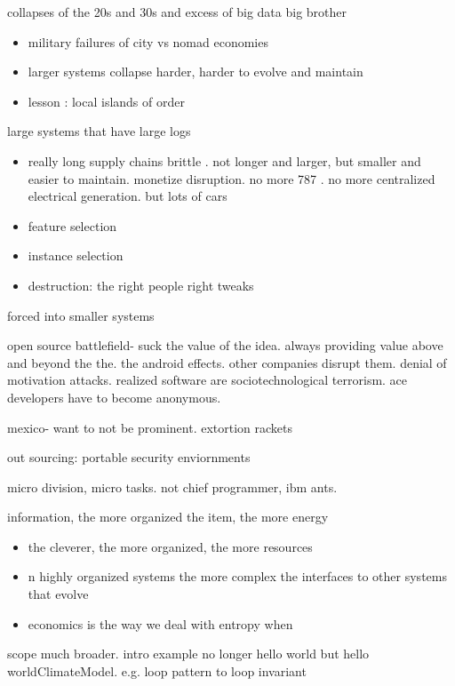 \documentclass[journal]{IEEEtran}
\newcommand{\bi}{\begin{itemize}}
\newcommand{\ei}{\end{itemize}}
\begin{document}
collapses of the 20s and 30s and excess of big data big brother
\bi
\item military failures of city vs nomad economies
\item larger systems collapse harder, harder to evolve and maintain
\item lesson : local islands of order
\ei

large systems that have large logs
\bi
\item really long supply chains brittle . not longer and larger, but
smaller and easier to maintain. monetize disruption. no more 787 .
no more centralized electrical generation.
but lots of cars
\item feature selection
\item instance selection
\item destruction: the right people right tweaks
\ei

forced into smaller systems

open source battlefield- suck the value of the idea. always providing value above and beyond
the the. the android effects. other companies disrupt them. denial of motivation attacks. realized software are sociotechnological terrorism. ace developers have to become anonymous.

mexico- want to not be prominent. extortion rackets 

out sourcing: portable security enviornments

micro division, micro tasks. not chief programmer, ibm ants.

information, the more organized the item, the more energy 
\bi
\item the cleverer, the more organized, the more resources
\item n highly organized systems the more complex the interfaces to other systems that evolve
\item economics is the way we deal with entropy when 
\ei

scope much broader. intro example no longer hello world but hello worldClimateModel. e.g. loop pattern to loop invariant
\end{document}
